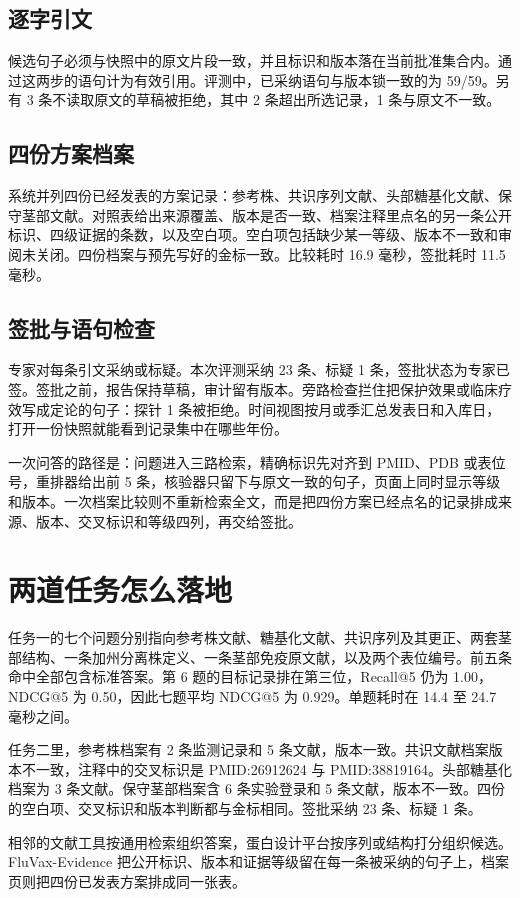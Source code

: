 \subsection{逐字引文}
候选句子必须与快照中的原文片段一致，并且标识和版本落在当前批准集合内。通过这两步的语句计为有效引用。评测中，已采纳语句与版本锁一致的为 59/59。另有 3 条不读取原文的草稿被拒绝，其中 2 条超出所选记录，1 条与原文不一致。

\subsection{四份方案档案}
系统并列四份已经发表的方案记录：参考株、共识序列文献、头部糖基化文献、保守茎部文献。对照表给出来源覆盖、版本是否一致、档案注释里点名的另一条公开标识、四级证据的条数，以及空白项。空白项包括缺少某一等级、版本不一致和审阅未关闭。四份档案与预先写好的金标一致。比较耗时 16.9 毫秒，签批耗时 11.5 毫秒。

\subsection{签批与语句检查}
专家对每条引文采纳或标疑。本次评测采纳 23 条、标疑 1 条，签批状态为专家已签。签批之前，报告保持草稿，审计留有版本。旁路检查拦住把保护效果或临床疗效写成定论的句子：探针 1 条被拒绝。时间视图按月或季汇总发表日和入库日，打开一份快照就能看到记录集中在哪些年份。

一次问答的路径是：问题进入三路检索，精确标识先对齐到 PMID、PDB 或表位号，重排器给出前 5 条，核验器只留下与原文一致的句子，页面上同时显示等级和版本。一次档案比较则不重新检索全文，而是把四份方案已经点名的记录排成来源、版本、交叉标识和等级四列，再交给签批。

\section{两道任务怎么落地}
任务一的七个问题分别指向参考株文献、糖基化文献、共识序列及其更正、两套茎部结构、一条加州分离株定义、一条茎部免疫原文献，以及两个表位编号。前五条命中全部包含标准答案。第 6 题的目标记录排在第三位，Recall@5 仍为 1.00，NDCG@5 为 0.50，因此七题平均 NDCG@5 为 0.929。单题耗时在 14.4 至 24.7 毫秒之间。

任务二里，参考株档案有 2 条监测记录和 5 条文献，版本一致。共识文献档案版本不一致，注释中的交叉标识是 PMID:26912624 与 PMID:38819164。头部糖基化档案为 3 条文献。保守茎部档案含 6 条实验登录和 5 条文献，版本不一致。四份的空白项、交叉标识和版本判断都与金标相同。签批采纳 23 条、标疑 1 条。

相邻的文献工具按通用检索组织答案，蛋白设计平台按序列或结构打分组织候选。FluVax-Evidence 把公开标识、版本和证据等级留在每一条被采纳的句子上，档案页则把四份已发表方案排成同一张表。

